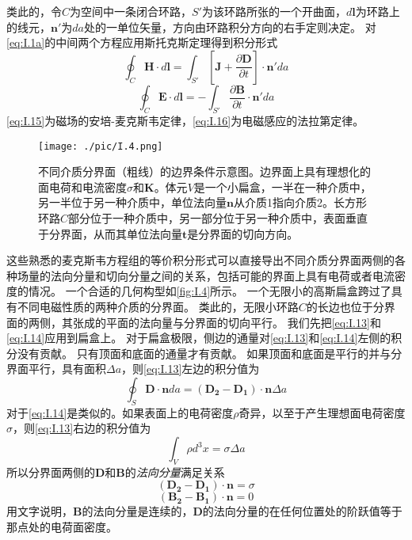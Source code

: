 \documentclass[12pt]{book}
\numberwithin{equation}{chapter}
\numberwithin{figure}{chapter}
\numberwithin{footnote}{page}
\begin{document}
类此的，令$C$为空间中一条闭合环路，$S'$为该环路所张的一个开曲面，$d\mathbf{l}$为环路上的线元，$\mathbf{n'}$为$da$处的一单位矢量，方向由环路积分方向的右手定则决定。
对\autoref{eq:I.1a}的中间两个方程应用斯托克斯定理得到积分形式
\begin{equation}\label{eq:I.15}
    \oint_C \mathbf{H}\cdot d\mathbf{l}=\int_{S'}[\mathbf{J}+\frac{\partial\mathbf{D}}{\partial t}]\cdot \mathbf{n'} da
\end{equation}
\begin{equation}\label{eq:I.16}
    \oint_C \mathbf{E}\cdot d\mathbf{l}=-\int_{S'}\frac{\partial\mathbf{B}}{\partial t}\cdot \mathbf{n'} da
\end{equation}
\autoref{eq:I.15}为磁场的安培-麦克斯韦定律，\autoref{eq:I.16}为电磁感应的法拉第定律。

\begin{figure}[!ht]
    \centering
    \texttt{[image: ./pic/I.4.png]}
    \captionsetup{justification=raggedright, singlelinecheck=false}
    \caption{不同介质分界面（粗线）的边界条件示意图。边界面上具有理想化的面电荷和电流密度$\sigma$和$\mathbf{K}$。体元$V$是一个小扁盒，一半在一种介质中，另一半位于另一种介质中，单位法向量$\mathbf{n}$从介质1指向介质2。长方形环路$C$部分位于一种介质中，另一部分位于另一种介质中，表面垂直于分界面，从而其单位法向量$\mathbf{t}$是分界面的切向方向。}
    \label{fig:I.4}
\end{figure}

这些熟悉的麦克斯韦方程组的等价积分形式可以直接导出不同介质分界面两侧的各种场量的法向分量和切向分量之间的关系，包括可能的界面上具有电荷或者电流密度的情况。
一个合适的几何构型如\autoref{fig:I.4}所示。
一个无限小的高斯扁盒跨过了具有不同电磁性质的两种介质的分界面。
类此的，无限小环路$C$的长边也位于分界面的两侧，其张成的平面的法向量与分界面的切向平行。
我们先把\autoref{eq:I.13}和\autoref{eq:I.14}应用到扁盒上。
对于扁盒极限，侧边的通量对\autoref{eq:I.13}和\autoref{eq:I.14}左侧的积分没有贡献。
只有顶面和底面的通量才有贡献。
如果顶面和底面是平行的并与分界面平行，具有面积$\Delta a$，则\autoref{eq:I.13}左边的积分值为
$$\oint_S \mathbf{D}\cdot \mathbf{n} da=(\mathbf{D_2}-\mathbf{D_1})\cdot \mathbf{n} \Delta a$$
对于\autoref{eq:I.14}是类似的。如果表面上的电荷密度$\rho$奇异，以至于产生理想面电荷密度$\sigma$，则\autoref{eq:I.13}右边的积分值为
$$\int_V \rho d^3x=\sigma \Delta a$$
所以分界面两侧的$\mathbf{D}$和$\mathbf{B}$的\textit{法向分量}满足关系
\begin{equation}\label{eq:I.17}
    (\mathbf{D_2}-\mathbf{D_1})\cdot \mathbf{n}=\sigma
\end{equation}
\begin{equation}\label{eq:I.18}
    (\mathbf{B_2}-\mathbf{B_1})\cdot \mathbf{n}=0
\end{equation}
用文字说明，$\mathbf{B}$的法向分量是连续的，$\mathbf{D}$的法向分量的在任何位置处的阶跃值等于那点处的电荷面密度。
\end{document}
